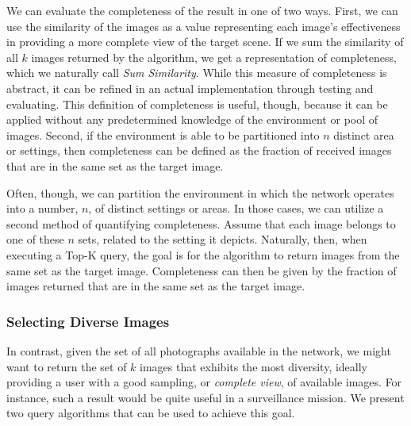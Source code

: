 We can evaluate the completeness of the result in one of two ways.  First, we can use the similarity of the images as a value representing each image's effectiveness in providing a more complete view of the target scene.  If we sum the similarity of all $k$ images returned by the algorithm, we get a representation of completeness, which we naturally call \emph{Sum Similarity}.  While this measure of completeness is abstract, it can be refined in an actual implementation through testing and evaluating.  This definition of completeness is useful, though, because it can be applied without any predetermined knowledge of the environment or pool of images.  
Second, if the environment is able to be partitioned into $n$ distinct area or settings, then completeness can be defined as the fraction of received images that are in the same set as the target image.

Often, though, we can partition the environment in which the network operates into a number, $n$, of distinct settings or areas.  In those cases, we can utilize a second method of quantifying completeness.  Assume that each image belongs to one of these $n$ sets, %
related to the setting it depicts.  Naturally, then, when executing a Top-K query, the goal is for the algorithm to return images from the same set as the target image.  Completeness can then be given by the fraction of images returned that are in the same set as the target image.

\subsubsection{Selecting Diverse Images}

In contrast, given the set of all photographs available in the network, we might want to return the set of $k$ images that exhibits the most diversity, ideally providing a user with a good sampling, or \emph{complete view}, of available images.  For instance, such a result would be quite useful in a surveillance mission.  We present two query algorithms that can be used to achieve this goal.


